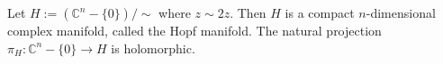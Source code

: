 Let $H := (\mathbb{C}^n - \{0\}) / \sim$ where $z \sim 2z$. Then $H$ is a compact $n$-dimensional complex manifold, called the Hopf manifold. The natural projection $\pi_H: \mathbb{C}^n - \{0\} \to H$ is holomorphic.
